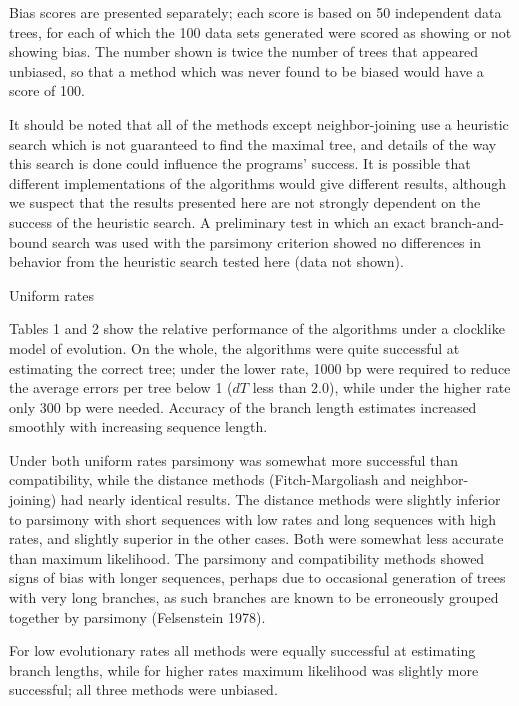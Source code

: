 Bias scores are 
presented separately; each score is based on 50 independent data 
trees, for each of which the 100 data sets generated were scored as
showing or not showing bias.  The number shown is twice the
number of trees that appeared unbiased, so that a method which was never
found to be biased would have a score of 100.

	It should be noted that all of the methods except neighbor-joining
use a heuristic search which is not guaranteed to find the maximal 
tree, and details of the way this search is done could influence the 
programs' success.  It is possible that different 
implementations of the algorithms would give different results, although we
suspect that the results presented here are not strongly dependent on the
success of the heuristic search.  A preliminary test in which an exact
branch-and-bound search was used with the parsimony criterion showed no
differences in behavior from the heuristic search tested here (data not
shown).

\bigskip

\bigskip

\noindent
Uniform rates
\bigskip


  Tables 1 and 2 show the relative 
performance of the algorithms under a clocklike model of evolution.  
On the whole, the algorithms were quite successful at estimating 
the correct tree; under the lower rate, 1000 bp were required to 
reduce the average errors per tree below 1 ($dT$ less than 2.0), while 
under the higher rate only 300 bp were needed.  Accuracy of the 
branch length estimates increased smoothly with increasing 
sequence length.

	Under both uniform rates parsimony was somewhat more 
successful than compatibility, while the distance methods (Fitch-Margoliash 
and neighbor-joining) had nearly 
identical results.  The distance methods were slightly inferior to 
parsimony with short sequences with low rates and long sequences with high 
rates, and slightly superior in the other cases.
Both were somewhat less accurate 
than maximum likelihood.  The parsimony and compatibility methods showed signs
of bias
with longer sequences, perhaps due to occasional generation of trees 
with very long branches, as such branches are known to be 
erroneously grouped together by parsimony (Felsenstein 1978).

	For low evolutionary rates all methods were equally 
successful at estimating branch lengths, while for higher rates 
maximum likelihood was slightly more successful; all three methods were 
unbiased.
\bigskip

